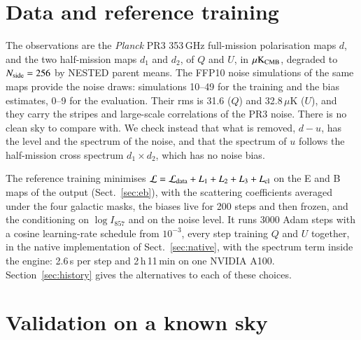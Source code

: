 \documentclass{aa}
\newcommand{\nside}{N_{\rm side}}
\begin{document}
\section{Data and reference training}\label{sec:data}

The observations are the \textit{Planck} PR3 353\,GHz full-mission polarisation maps \citep[PSB detectors;][]{planck2020hfi} $d$, and the two half-mission maps $d_1$ and $d_2$, of $Q$ and $U$, in $\mu{\rm K}_{\rm CMB}$, degraded to $\nside=256$ by NESTED parent means. The FFP10 noise simulations of the same maps provide the noise draws: simulations 10--49 for the training and the bias estimates, 0--9 for the evaluation. Their rms is 31.6 ($Q$) and 32.8\,$\mu$K ($U$), and they carry the stripes and large-scale correlations of the PR3 noise. There is no clean sky to compare with. We check instead that what is removed, $d-u$, has the level and the spectrum of the noise, and that the spectrum of $u$ follows the half-mission cross spectrum $d_1\times d_2$, which has no noise bias.

The reference training minimises $\mathcal{L}=\mathcal{L}_{\rm data}+L_1+L_2+L_3+L_{\rm cl}$ on the E and B maps of the output (Sect.~\ref{sec:eb}), with the scattering coefficients averaged under the four galactic masks, the biases live for 200 steps and then frozen, and the conditioning on $\log I_{857}$ and on the noise level. It runs 3000 Adam steps with a cosine learning-rate schedule from $10^{-3}$, every step training $Q$ and $U$ together, in the native implementation of Sect.~\ref{sec:native}, with the spectrum term inside the engine: 2.6\,s per step and 2\,h\,11\,min on one NVIDIA A100. Section~\ref{sec:history} gives the alternatives to each of these choices.

\section{Validation on a known sky}\label{sec:sim}
\end{document}
